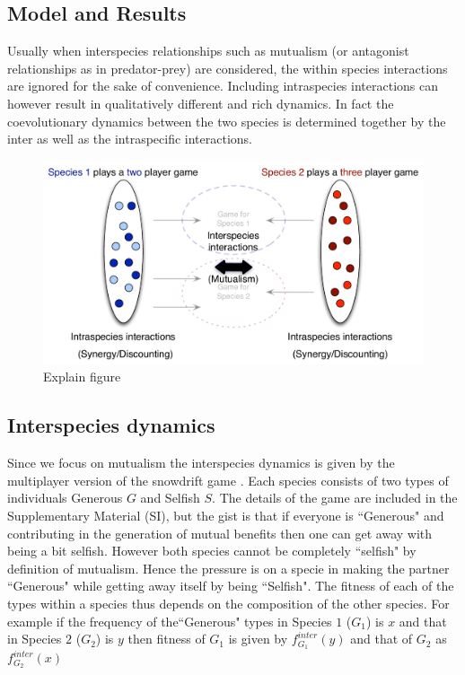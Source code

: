 \documentclass{pnastwo}
\begin{document}
\begin{article}
\section{Model and Results}



Usually when interspecies relationships such as mutualism (or antagonist relationships as in predator-prey) are considered, the within species interactions are ignored for the sake of convenience. Including intraspecies interactions can however result in qualitatively different and rich dynamics.
In fact the coevolutionary dynamics between the two species is determined together by the inter as well as the intraspecific interactions.


\begin{figure}[h]
\begin{center}
\includegraphics[width=\columnwidth]{../Figures/interintra.pdf}
\caption{
Explain figure
}
\end{center}
\end{figure}

\subsection{Interspecies dynamics}

Since we focus on mutualism the interspecies dynamics is given by the multiplayer version of the snowdrift game \cite{bergstrom:PNAS:2003,souza:JTB:2009,gokhale:PRSB:2012}.
Each species consists of two types of individuals Generous $G$ and Selfish $S$. 
The details of the game are included in the Supplementary Material (SI), but the gist is that if everyone is ``Generous" and contributing in the generation of mutual benefits then one can get away with being a bit selfish. However both species cannot be completely ``selfish" by definition of mutualism.
Hence the pressure is on a specie in making the partner ``Generous" while getting away itself by being ``Selfish".
The fitness of each of the types within a species thus depends on the composition of the other species.
For example if the frequency of the``Generous" types in Species $1$ ($G_1$) is $x$ and that in Species $2$ ($G_2$) is $y$ then fitness of $G_1$  is given by $f^{inter}_{G_1} (y)$ and that of $G_2$ as $f^{inter}_{G_2} (x)$


\end{article}
\end{document}
